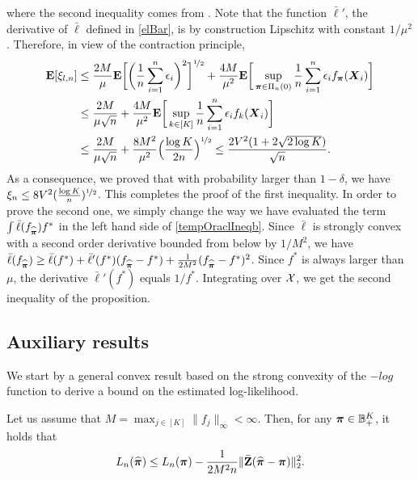 where the second inequality comes from \citep[Th.\ 11.5]{boucheron2013concentration}. Note that the function $\bar\ell'$, the derivative of $\bar\ell$ defined in \eqref{elBar},
is by construction Lipschitz with constant $1/\mu^2$. Therefore, in view of the contraction
principle,
\begin{align}
\mathbf E[\xi_{l,n}]
&\le \frac{2M}{\mu}\mathbf E\bigg[\bigg(\frac1n\sum_{i=1}^n \epsilon_i\bigg)^2\bigg]^{\nicefrac12}+
\frac{4M}{\mu^2}\mathbf E\bigg[\sup_{\boldsymbol \pi\in\Pi_n(0)} \frac1n\sum_{i=1}^n
\epsilon_if_{\boldsymbol \pi}(\boldsymbol X_i)\bigg]\\
&\le \frac{2M}{\mu\sqrt{n}}+
\frac{4M}{\mu^2}\mathbf E\bigg[\sup_{k\in[K]} \frac1n\sum_{i=1}^n
\epsilon_i f_k(\boldsymbol X_i)\bigg]\\
&\le \frac{2M}{\mu\sqrt{n}}+
\frac{8M^2}{\mu^2}\Big(\frac{\log K}{2n}\Big)^{\nicefrac12} \le \frac{2V^2(1+2\sqrt{2\log K})}{\sqrt{n}}.
\end{align}
As a consequence, we proved that with probability larger than $1-\delta$, we have
$\xi_n\le 8V^2(\frac{\log K}{n})^{\nicefrac12}$. This completes the proof of the first inequality.
In order to prove the second one, we simply change the way we have evaluated the term
$\int \bar\ell(f_{\widehat{\boldsymbol \pi}})f^*$ in the left hand side of \eqref{tempOraclIneqb}. Since
$\bar\ell$ is strongly convex with a second order derivative bounded from below by $1/M^2$, we
have $\bar\ell(f_{\widehat{\boldsymbol \pi}})\ge \bar\ell(f^*) + \bar\ell'(f^*)(f_{\widehat{\boldsymbol \pi}}-f^*)+
\frac1{2M^2}(f_{\widehat{\boldsymbol \pi}}-f^*)^2$. Since $f^*$ is always larger than $\mu$, the derivative
$\bar\ell'(f^*)$ equals $1/f^*$. Integrating over $\mathcal X$, we get the second inequality of
the proposition.


\subsection{Auxiliary results}\label{ssec:auxiliary}


We start by a general convex result based on the strong convexity of the $-log$ function to
derive a bound on the estimated log-likelihood.
\begin{lemma}{}
	\label{convexlemma}
	Let us assume that $M =\max_{j\in[K]}\|f_j\|_\infty<\infty$. Then, for any $\boldsymbol \pi\in {\mathbb B}^K_+$, it holds that
	\begin{equation}
	L_n(\widehat{\boldsymbol \pi}) \le L_n(\boldsymbol \pi) -\frac1{2M^2n}\|\bar{\mathbf Z}(\widehat{\boldsymbol \pi}-\boldsymbol \pi)\|_2^2.
	\end{equation}
\end{lemma}


